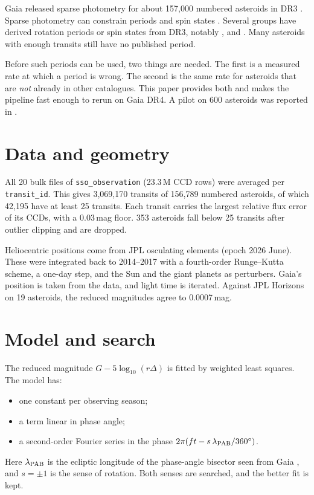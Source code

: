 \documentclass[twocolumn]{aastex631}
\begin{document}
Gaia \citep{Prusti2016} released sparse photometry for about 157{,}000 numbered asteroids in DR3
\citep{Vallenari2023,Tanga2023}. Sparse photometry can constrain periods and spin states
\citep{Kaasalainen2004}. Several groups have derived rotation periods or spin states from DR3, notably
\citet{Durech2023}, \citet{Cellino2024} and \citet{MacLennan2026}. Many asteroids with enough transits
still have no published period.

Before such periods can be used, two things are needed. The first is a measured rate at which a period is
wrong. The second is the same rate for asteroids that are \emph{not} already in other catalogues. This
paper provides both and makes the pipeline fast enough to rerun on Gaia DR4. A pilot on 600 asteroids was
reported in \citet{Tropynin2026a}.

\section{Data and geometry}

All 20 bulk files of \texttt{sso\_observation} (23.3\,M CCD rows) were averaged per \texttt{transit\_id}.
This gives 3{,}069{,}170 transits of 156{,}789 numbered asteroids, of which 42{,}195 have at least 25
transits. Each transit carries the largest relative flux error of its CCDs, with a 0.03\,mag floor.
353 asteroids fall below 25 transits after outlier clipping and are dropped.

Heliocentric positions come from JPL osculating elements (epoch 2026 June). These were integrated back to
2014--2017 with a fourth-order Runge--Kutta scheme, a one-day step, and the Sun and the giant planets as
perturbers. Gaia's position is taken from the data, and light time is iterated. Against JPL Horizons on
19 asteroids, the reduced magnitudes agree to 0.0007\,mag.

\section{Model and search}

The reduced magnitude $G-5\log_{10}(r\Delta)$ is fitted by weighted least squares. The model has:
\begin{itemize}
\item one constant per observing season;
\item a term linear in phase angle;
\item a second-order Fourier series in the phase $2\pi(ft - s\,\lambda_{\rm PAB}/360^\circ)$.
\end{itemize}
Here $\lambda_{\rm PAB}$ is the ecliptic longitude of the phase-angle bisector seen from Gaia
\citep{Harris1984}, and $s=\pm1$ is the sense of rotation. Both senses are searched, and the better fit is
kept.
\end{document}
